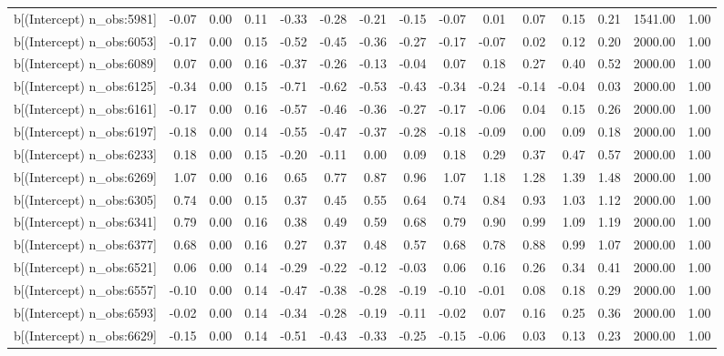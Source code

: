 \begin{table}[ht]
\begin{tabular}{rrrrrrrrrrrrrrr}
  b[(Intercept) n\_obs:5981] & -0.07 & 0.00 & 0.11 & -0.33 & -0.28 & -0.21 & -0.15 & -0.07 & 0.01 & 0.07 & 0.15 & 0.21 & 1541.00 & 1.00 \\ 
  b[(Intercept) n\_obs:6053] & -0.17 & 0.00 & 0.15 & -0.52 & -0.45 & -0.36 & -0.27 & -0.17 & -0.07 & 0.02 & 0.12 & 0.20 & 2000.00 & 1.00 \\ 
  b[(Intercept) n\_obs:6089] & 0.07 & 0.00 & 0.16 & -0.37 & -0.26 & -0.13 & -0.04 & 0.07 & 0.18 & 0.27 & 0.40 & 0.52 & 2000.00 & 1.00 \\ 
  b[(Intercept) n\_obs:6125] & -0.34 & 0.00 & 0.15 & -0.71 & -0.62 & -0.53 & -0.43 & -0.34 & -0.24 & -0.14 & -0.04 & 0.03 & 2000.00 & 1.00 \\ 
  b[(Intercept) n\_obs:6161] & -0.17 & 0.00 & 0.16 & -0.57 & -0.46 & -0.36 & -0.27 & -0.17 & -0.06 & 0.04 & 0.15 & 0.26 & 2000.00 & 1.00 \\ 
  b[(Intercept) n\_obs:6197] & -0.18 & 0.00 & 0.14 & -0.55 & -0.47 & -0.37 & -0.28 & -0.18 & -0.09 & 0.00 & 0.09 & 0.18 & 2000.00 & 1.00 \\ 
  b[(Intercept) n\_obs:6233] & 0.18 & 0.00 & 0.15 & -0.20 & -0.11 & 0.00 & 0.09 & 0.18 & 0.29 & 0.37 & 0.47 & 0.57 & 2000.00 & 1.00 \\ 
  b[(Intercept) n\_obs:6269] & 1.07 & 0.00 & 0.16 & 0.65 & 0.77 & 0.87 & 0.96 & 1.07 & 1.18 & 1.28 & 1.39 & 1.48 & 2000.00 & 1.00 \\ 
  b[(Intercept) n\_obs:6305] & 0.74 & 0.00 & 0.15 & 0.37 & 0.45 & 0.55 & 0.64 & 0.74 & 0.84 & 0.93 & 1.03 & 1.12 & 2000.00 & 1.00 \\ 
  b[(Intercept) n\_obs:6341] & 0.79 & 0.00 & 0.16 & 0.38 & 0.49 & 0.59 & 0.68 & 0.79 & 0.90 & 0.99 & 1.09 & 1.19 & 2000.00 & 1.00 \\ 
  b[(Intercept) n\_obs:6377] & 0.68 & 0.00 & 0.16 & 0.27 & 0.37 & 0.48 & 0.57 & 0.68 & 0.78 & 0.88 & 0.99 & 1.07 & 2000.00 & 1.00 \\ 
  b[(Intercept) n\_obs:6521] & 0.06 & 0.00 & 0.14 & -0.29 & -0.22 & -0.12 & -0.03 & 0.06 & 0.16 & 0.26 & 0.34 & 0.41 & 2000.00 & 1.00 \\ 
  b[(Intercept) n\_obs:6557] & -0.10 & 0.00 & 0.14 & -0.47 & -0.38 & -0.28 & -0.19 & -0.10 & -0.01 & 0.08 & 0.18 & 0.29 & 2000.00 & 1.00 \\ 
  b[(Intercept) n\_obs:6593] & -0.02 & 0.00 & 0.14 & -0.34 & -0.28 & -0.19 & -0.11 & -0.02 & 0.07 & 0.16 & 0.25 & 0.36 & 2000.00 & 1.00 \\ 
  b[(Intercept) n\_obs:6629] & -0.15 & 0.00 & 0.14 & -0.51 & -0.43 & -0.33 & -0.25 & -0.15 & -0.06 & 0.03 & 0.13 & 0.23 & 2000.00 & 1.00 \\ 

\end{tabular}
\end{table}
